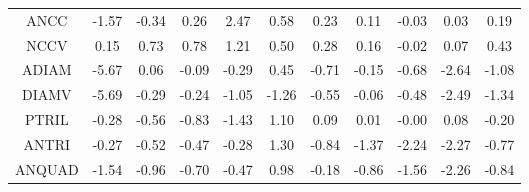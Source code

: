 \documentclass[11pt,a4paper]{report}
\begin{document}
\begin{longtable}{ | c || c | c | c | c | c | c | c | c | c || c |}
ANCC &  \cellcolor[HTML]{FFD7D7} -1.57 &  \cellcolor[HTML]{FFF7F7} -0.34 &  \cellcolor[HTML]{F7F7FF} 0.26 &  \cellcolor[HTML]{BFBFFF} 2.47 &  \cellcolor[HTML]{EFEFFF} 0.58 &  \cellcolor[HTML]{F7F7FF} 0.23 &  \cellcolor[HTML]{FFFFFF} 0.11 &  \cellcolor[HTML]{FFFFFF} -0.03 &  \cellcolor[HTML]{FFFFFF} 0.03 &  \cellcolor[HTML]{F7F7FF} 0.19 \\
NCCV &  \cellcolor[HTML]{FFFFFF} 0.15 &  \cellcolor[HTML]{EFEFFF} 0.73 &  \cellcolor[HTML]{EFEFFF} 0.78 &  \cellcolor[HTML]{DFDFFF} 1.21 &  \cellcolor[HTML]{EFEFFF} 0.50 &  \cellcolor[HTML]{F7F7FF} 0.28 &  \cellcolor[HTML]{F7F7FF} 0.16 &  \cellcolor[HTML]{FFFFFF} -0.02 &  \cellcolor[HTML]{FFFFFF} 0.07 &  \cellcolor[HTML]{F7F7FF} 0.43 \\
ADIAM &  \cellcolor[HTML]{FF7070} -5.67 &  \cellcolor[HTML]{FFFFFF} 0.06 &  \cellcolor[HTML]{FFFFFF} -0.09 &  \cellcolor[HTML]{FFF7F7} -0.29 &  \cellcolor[HTML]{F7F7FF} 0.45 &  \cellcolor[HTML]{FFEFEF} -0.71 &  \cellcolor[HTML]{FFFFFF} -0.15 &  \cellcolor[HTML]{FFEFEF} -0.68 &  \cellcolor[HTML]{FFBFBF} -2.64 &  \cellcolor[HTML]{FFE7E7} -1.08 \\
DIAMV &  \cellcolor[HTML]{FF7070} -5.69 &  \cellcolor[HTML]{FFF7F7} -0.29 &  \cellcolor[HTML]{FFF7F7} -0.24 &  \cellcolor[HTML]{FFE7E7} -1.05 &  \cellcolor[HTML]{FFDFDF} -1.26 &  \cellcolor[HTML]{FFEFEF} -0.55 &  \cellcolor[HTML]{FFFFFF} -0.06 &  \cellcolor[HTML]{FFF7F7} -0.48 &  \cellcolor[HTML]{FFBFBF} -2.49 &  \cellcolor[HTML]{FFDFDF} -1.34 \\
PTRIL &  \cellcolor[HTML]{FFF7F7} -0.28 &  \cellcolor[HTML]{FFEFEF} -0.56 &  \cellcolor[HTML]{FFE7E7} -0.83 &  \cellcolor[HTML]{FFD7D7} -1.43 &  \cellcolor[HTML]{E7E7FF} 1.10 &  \cellcolor[HTML]{FFFFFF} 0.09 &  \cellcolor[HTML]{FFFFFF} 0.01 &  \cellcolor[HTML]{FFFFFF} -0.00 &  \cellcolor[HTML]{FFFFFF} 0.08 &  \cellcolor[HTML]{FFF7F7} -0.20 \\
ANTRI &  \cellcolor[HTML]{FFF7F7} -0.27 &  \cellcolor[HTML]{FFEFEF} -0.52 &  \cellcolor[HTML]{FFF7F7} -0.47 &  \cellcolor[HTML]{FFF7F7} -0.28 &  \cellcolor[HTML]{DFDFFF} 1.30 &  \cellcolor[HTML]{FFE7E7} -0.84 &  \cellcolor[HTML]{FFDFDF} -1.37 &  \cellcolor[HTML]{FFC7C7} -2.24 &  \cellcolor[HTML]{FFC7C7} -2.27 &  \cellcolor[HTML]{FFEFEF} -0.77 \\
ANQUAD &  \cellcolor[HTML]{FFD7D7} -1.54 &  \cellcolor[HTML]{FFE7E7} -0.96 &  \cellcolor[HTML]{FFEFEF} -0.70 &  \cellcolor[HTML]{FFF7F7} -0.47 &  \cellcolor[HTML]{E7E7FF} 0.98 &  \cellcolor[HTML]{FFF7F7} -0.18 &  \cellcolor[HTML]{FFE7E7} -0.86 &  \cellcolor[HTML]{FFD7D7} -1.56 &  \cellcolor[HTML]{FFC7C7} -2.26 &  \cellcolor[HTML]{FFE7E7} -0.84 \\

\end{longtable}
\end{document}
